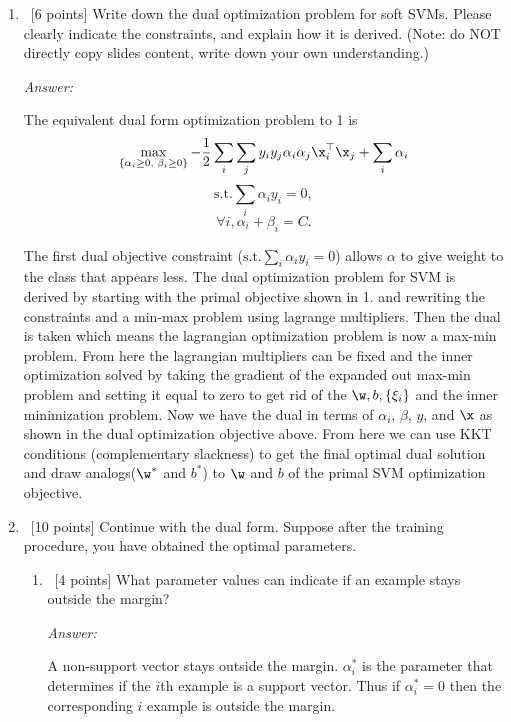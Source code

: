 \documentclass[12pt, fullpage,letterpaper]{article}
\begin{document}
\begin{enumerate}
\begin{enumerate}
	\end{enumerate}
	
	
	\item~[6 points] Write down the dual optimization problem for soft SVMs.  
	Please clearly indicate the constraints, and explain how it is derived. (Note: do NOT directly copy slides content, write down your own understanding.)
	
	\textit{Answer:}

	The equivalent dual form optimization problem to 1 is 
	\[
		\max_{\{\alpha_i \ge 0 \text{, } \beta_i \ge 0\}} {-\frac{1}{2} \sum_i \sum_j y_i y_j \alpha_i \alpha_j \x_i^\top \x_j} + \sum_i{\alpha_i}
	\]
	\[
		\text{s.t.} \sum_i{\alpha_i y_i} = 0,
	\]
	\[
		\forall i, \alpha_i + \beta_i = C.
	\]

	The first dual objective constraint ($\text{s.t.} \sum_i{\alpha_i y_i} = 0$) allows $\alpha$ to give weight to the class that appears less.
	The dual optimization problem for SVM is derived by starting with the primal objective shown in 1. and rewriting the constraints and a min-max problem using lagrange multipliers.
	Then the dual is taken which means the lagrangian optimization problem is now a max-min problem. 
	From here the lagrangian multipliers can be fixed and the inner optimization solved by taking the gradient of the expanded out max-min problem and setting it equal to zero to get rid of the $\w, b, \{\xi_i\}$ and the inner minimization problem.
	Now we have the dual in terms of $\alpha_i$, $\beta$, $y$, and $\x$ as shown in the dual optimization objective above.
	From here we can use KKT conditions (complementary slackness) to get the final optimal dual solution and draw analogs($\w^*$ and $b^*$) to $\w$ and $b$ of the primal SVM optimization objective.


	
	\item~[10 points] Continue with the dual form. Suppose after the training procedure, you have obtained the optimal parameters.
	\begin{enumerate}
		\item~[4 points] What parameter values can indicate if an example stays outside the margin?

		\textit{Answer:}

		A non-support vector stays outside the margin.
		$\alpha_i^*$ is the parameter that determines if the $i$th example is a support vector.
		Thus if $\alpha_i^* = 0$ then the corresponding $i$ example is outside the margin.


\end{enumerate}
\end{enumerate}
\end{document}
